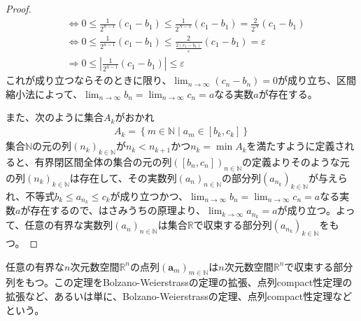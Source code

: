 \documentclass[dvipdfmx]{jsarticle}
\begin{document}
\begin{proof}
\begin{align*}
&\Leftrightarrow 0 \leq \frac{1}{2^{n - 1}}\left( c_{1} - b_{1} \right) \leq \frac{1}{2^{N - 1}}\left( c_{1} - b_{1} \right) = \frac{2}{2^{N}}\left( c_{1} - b_{1} \right)\\
&\Leftrightarrow 0 \leq \frac{1}{2^{n - 1}}\left( c_{1} - b_{1} \right) \leq \frac{2}{\frac{2\left( c_{1} - b_{1} \right)}{\varepsilon}}\left( c_{1} - b_{1} \right) = \varepsilon\\
&\Rightarrow 0 \leq \left| \frac{1}{2^{n - 1}}\left( c_{1} - b_{1} \right) \right| \leq \varepsilon
\end{align*}
これが成り立つならそのときに限り、$\lim_{n \rightarrow \infty}\left( c_{n} - b_{n} \right) = 0$が成り立ち、区間縮小法によって、$\lim_{n \rightarrow \infty}b_{n} = \lim_{n \rightarrow \infty}c_{n} = a$なる実数$a$が存在する。\par
また、次のように集合$A_{k}$がおかれ
\begin{align*}
A_{k} = \left\{ m \in \mathbb{N} \middle| a_{m} \in \left[ b_{k},c_{k} \right] \right\}
\end{align*}
集合$\mathbb{N}$の元の列$\left( n_{k} \right)_{k \in \mathbb{N}}$が$n_{k} < n_{k + 1}$かつ$n_{k} = \min A_{k}$を満たすように定義されると、有界閉区間全体の集合の元の列$\left( \left[ b_{n},c_{n} \right] \right)_{n \in \mathbb{N}}$の定義よりそのような元の列$\left( n_{k} \right)_{k \in \mathbb{N}}$は存在して、その実数列$\left( a_{n} \right)_{n \in \mathbb{N}}$の部分列$\left( a_{n_{k}} \right)_{k \in \mathbb{N}}$が与えられ、不等式$b_{k} \leq a_{n_{k}} \leq c_{k}$が成り立つかつ、$\lim_{n \rightarrow \infty}b_{n} = \lim_{n \rightarrow \infty}c_{n} = a$なる実数$a$が存在するので、はさみうちの原理より、$\lim_{k \rightarrow \infty}a_{n_{k}} = a$が成り立つ。よって、任意の有界な実数列$\left( a_{n} \right)_{n \in \mathbb{N}}$は集合$\mathbb{R}$で収束する部分列$\left( a_{n_{k}} \right)_{k \in \mathbb{N}}$をもつ。
\end{proof}
\begin{thm}\label{4.1.5.8}
任意の有界な$n$次元数空間$\mathbb{R}^{n}$の点列$\left( \mathbf{a}_{m} \right)_{m \in \mathbb{N}}$は$n$次元数空間$\mathbb{R}^{n}$で収束する部分列をもつ。この定理をBolzano-Weierstrassの定理の拡張、点列compact性定理の拡張など、あるいは単に、Bolzano-Weierstrassの定理、点列compact性定理などという。
\end{thm}
\end{document}
